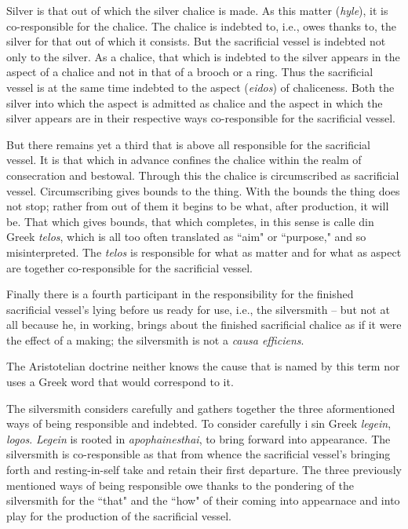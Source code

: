 Silver is that out of which the silver chalice is made. As this matter (\textit{hyle}), it is co-responsible for the chalice. The chalice is indebted to, i.e., owes thanks to, the silver for that out of which it consists. But the sacrificial vessel is indebted not only to the silver. As a chalice, that which is indebted to the silver appears in the aspect of a chalice and not in that of a brooch or a ring. Thus the sacrificial vessel is at the same time indebted to the aspect (\textit{eidos}) of chaliceness. Both the silver into which the aspect is admitted as chalice and the aspect in which the silver appears are in their respective ways co-responsible for the sacrificial vessel.

But there remains yet a third that is above all responsible for the sacrificial vessel. It is that which in advance confines the chalice within the realm of consecration and bestowal. Through this the chalice is circumscribed as sacrificial vessel. Circumscribing gives bounds to the thing. With the bounds the thing does not stop; rather from out of them it begins to be what, after production, it will be. That which gives bounds, that which completes, in this sense is calle din Greek \textit{telos}, which is all too often translated as ``aim" or ``purpose," and so misinterpreted. The \textit{telos} is responsible for what as matter and for what as aspect are together co-responsible for the sacrificial vessel.

Finally there is a fourth participant in the responsibility for the finished sacrificial vessel's lying before us ready for use, i.e., the silversmith -- but not at all because he, in working, brings about the finished sacrificial chalice as if it were the effect of a making; the silversmith is not a \textit{causa efficiens}.

The Aristotelian doctrine neither knows the cause that is named by this term nor uses a Greek word that would correspond to it.

The silversmith considers carefully and gathers together the three aformentioned ways of being responsible and indebted. To consider carefully i sin Greek \textit{legein}, \textit{logos}. \textit{Legein} is rooted in \textit{apophainesthai}, to bring forward into appearance. The silversmith is co-responsible as that from whence the sacrificial vessel's bringing forth and resting-in-self take and retain their first departure. The three previously mentioned ways of being responsible owe thanks to the pondering of the silversmith for the ``that" and the ``how" of their coming into appearnace and into play for the production of the sacrificial vessel.

